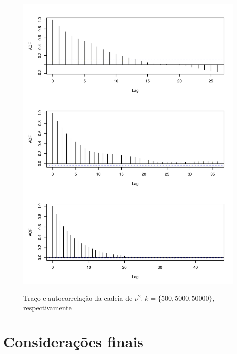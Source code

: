 \documentclass[9pt]{beamer}
\begin{document}
\begin{frame}
\begin{figure}[htb]
{{			\includegraphics[scale=0.32]{acf_nu_mh.pdf}}}%
	\caption{Traço e autocorrelação da cadeia de $\nu^2$, $k = \{500, 5000, 50000\}$, respectivamente}%
\end{figure}
\end{frame}
\section{Considerações finais}
\begin{frame}
\end{frame}

\end{document}
